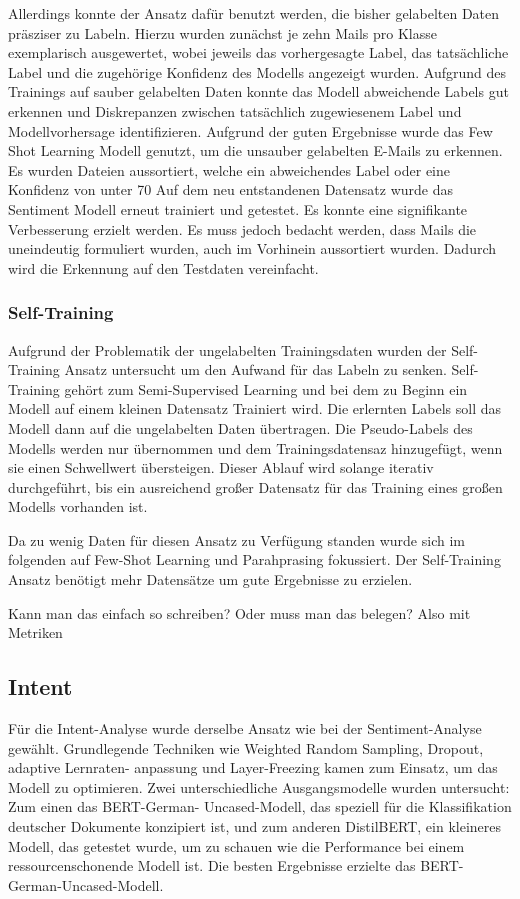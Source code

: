 Allerdings konnte der Ansatz dafür benutzt werden, die bisher gelabelten Daten präsziser zu Labeln. Hierzu wurden zunächst je zehn Mails pro Klasse exemplarisch ausgewertet, wobei jeweils das vorhergesagte Label, das tatsächliche Label und die zugehörige Konfidenz des Modells angezeigt wurden. Aufgrund des Trainings auf sauber gelabelten Daten konnte das Modell abweichende Labels gut erkennen und Diskrepanzen zwischen tatsächlich zugewiesenem Label und Modellvorhersage identifizieren. Aufgrund der guten Ergebnisse wurde das Few Shot Learning Modell genutzt, um die unsauber gelabelten E-Mails zu erkennen. Es wurden Dateien aussortiert, welche ein abweichendes Label oder eine Konfidenz von unter 70 %
Auf dem neu entstandenen Datensatz wurde das Sentiment Modell erneut trainiert und getestet. Es konnte eine signifikante Verbesserung erzielt werden. Es muss jedoch bedacht werden, dass Mails die uneindeutig formuliert wurden, auch im Vorhinein aussortiert wurden. Dadurch wird die Erkennung auf den Testdaten vereinfacht. 


\subsubsection{Self-Training}
Aufgrund der Problematik der ungelabelten Trainingsdaten wurden der Self-Training Ansatz
untersucht um den Aufwand für das Labeln zu senken. Self-Training gehört zum Semi-Supervised
Learning und bei dem zu Beginn ein Modell auf einem kleinen Datensatz Trainiert wird. Die
erlernten Labels soll das Modell dann auf die ungelabelten Daten übertragen. Die Pseudo-Labels
des Modells werden nur übernommen und dem Trainingsdatensaz hinzugefügt, wenn sie einen
Schwellwert übersteigen. Dieser Ablauf wird solange iterativ durchgeführt, bis ein ausreichend
großer Datensatz für das Training eines großen Modells vorhanden ist.  

Da zu wenig Daten für diesen Ansatz zu Verfügung standen wurde sich im folgenden auf Few-Shot
Learning und Parahprasing fokussiert. Der Self-Training Ansatz benötigt mehr Datensätze um
gute Ergebnisse zu erzielen.  

 

Kann man das einfach so schreiben? Oder muss man das belegen? Also mit Metriken



\subsection{Intent} 
Für die Intent-Analyse wurde derselbe Ansatz wie bei der Sentiment-Analyse gewählt. Grundlegende Techniken wie Weighted Random Sampling, Dropout, adaptive Lernraten- anpassung und Layer-Freezing kamen zum Einsatz, um das Modell zu optimieren. Zwei unterschiedliche Ausgangsmodelle wurden untersucht: Zum einen das BERT-German- Uncased-Modell, das speziell für die Klassifikation deutscher Dokumente konzipiert ist, und zum anderen DistilBERT, ein kleineres Modell, das getestet wurde, um zu schauen wie die Performance bei einem ressourcenschonende Modell ist. Die besten Ergebnisse erzielte das BERT-German-Uncased-Modell. 

